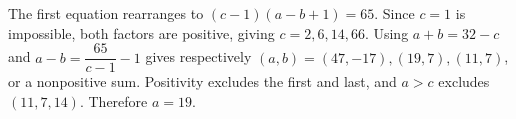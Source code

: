 The first equation rearranges to $(c-1)(a-b+1)=65$. Since $c=1$ is impossible, both factors are positive, giving $c=2,6,14,66$. Using $a+b=32-c$ and $a-b=\dfrac{65}{c-1}-1$ gives respectively $(a,b)=(47,-17),(19,7),(11,7)$, or a nonpositive sum. Positivity excludes the first and last, and $a>c$ excludes $(11,7,14)$. Therefore $\boxed{a=19}$.
